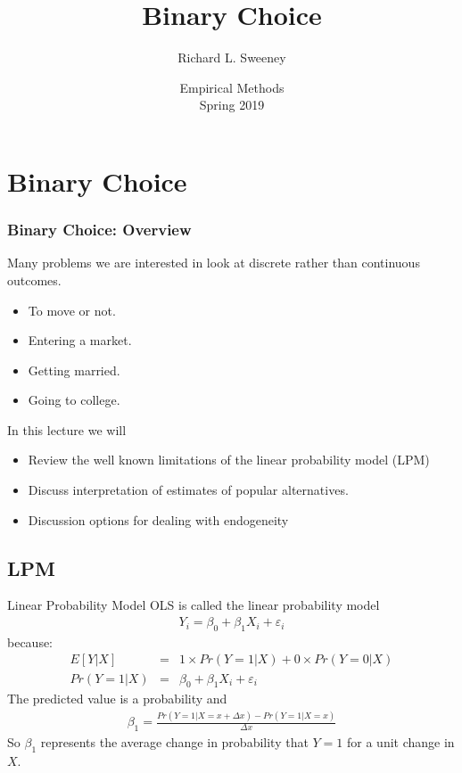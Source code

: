 \documentclass[11pt,dvipsnames,table,aspectratio=169]{beamer}
\title{Binary Choice}
\author{Richard L. Sweeney}
\institute{based on slides by Chris Conlon}
\date{Empirical Methods \\ Spring 2019}
\begin{document}


\begin{frame}
    \titlepage
\end{frame}

\begin{frame}
    \tableofcontents  
\end{frame}

\section{Binary Choice}

\begin{frame}[c]
\frametitle{Binary Choice: Overview}
Many problems we are interested in look at discrete rather than continuous outcomes.
\begin{itemize}
       \item To move or not. 
       \item Entering a market.
       \item Getting married. 
       \item Going to college.
\end{itemize}

\vspace{2em}
In this lecture we will 
\begin{itemize}
\item Review the well known limitations of the linear probability model (LPM)
\item Discuss interpretation of estimates of popular alternatives. 
\item Discussion options for dealing with endogeneity
\end{itemize}
\end{frame}


\subsection{LPM}

\begin{frame}{Linear Probability Model}
       OLS is called the \alert{linear probability model} 
       \begin{eqnarray*}
       Y_i  = \beta_0 + \beta_1 X_i + \varepsilon_i 
       \end{eqnarray*}
       because:
       \begin{eqnarray*}
       E[Y | X] &=& 1 \times Pr(Y=1 | X) + 0 \times Pr(Y=0  | X) \\
       Pr(Y=1 | X) &=& \beta_0 + \beta_1 X_i + \varepsilon_i
       \end{eqnarray*}
       The predicted value is a \alert{probability} and 
       \begin{eqnarray*}
       \beta_1 = \frac{Pr(Y=1 | X =x+\Delta x) - Pr(Y=1 | X=x)}{\Delta x}
       \end{eqnarray*}
       So $\beta_1$ represents the average change in probability that $Y=1$ for a unit change in $X$.
\end{frame}
\end{document}
